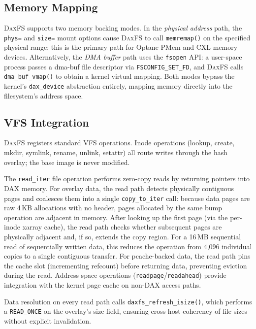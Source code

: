 \documentclass[letterpaper,twocolumn,10pt]{article}
\newcommand{\daxfs}{\textsc{DaxFS}\xspace}
\begin{document}
\subsection{Memory Mapping}

\daxfs supports two memory backing modes.  In the \emph{physical
address} path, the \texttt{phys=} and \texttt{size=} mount options
cause \daxfs to call \texttt{memremap()} on the specified physical
range; this is the primary path for Optane PMem and CXL memory
devices.  Alternatively, the \emph{DMA buffer} path uses the
\texttt{fsopen} API: a user-space process passes a dma-buf file
descriptor via \texttt{FSCONFIG\_SET\_FD}, and \daxfs calls
\texttt{dma\_buf\_vmap()} to obtain a kernel virtual mapping.  Both
modes bypass the kernel's \texttt{dax\_device} abstraction entirely,
mapping memory directly into the filesystem's address space.

\subsection{VFS Integration}

\daxfs registers standard VFS operations.  Inode operations (lookup,
create, mkdir, symlink, rename, unlink, setattr) all route writes
through the hash overlay; the base image is never modified.

The \texttt{read\_iter} file operation performs zero-copy reads by
returning pointers into DAX memory.  For overlay data, the read path
detects physically contiguous pages and coalesces them into a single
\texttt{copy\_to\_iter} call: because data pages are raw 4\,KB
allocations with no header, pages allocated by the same bump operation
are adjacent in memory.  After looking up the first page (via the
per-inode xarray cache), the read path checks whether subsequent pages
are physically adjacent and, if so, extends the copy region.  For a
16\,MB sequential read of sequentially written data, this reduces the
operation from 4,096 individual copies to a single contiguous transfer.
For pcache-backed data, the read path pins the cache slot (incrementing
refcount) before returning data, preventing eviction during the read.
Address space operations (\texttt{readpage}/\texttt{readahead}) provide
integration with the kernel page cache on non-DAX access paths.

Data resolution on every read path calls
\texttt{daxfs\_refresh\_isize()}, which performs a \texttt{READ\_ONCE}
on the overlay's size field, ensuring cross-host coherency of file
sizes without explicit invalidation.
\end{document}
